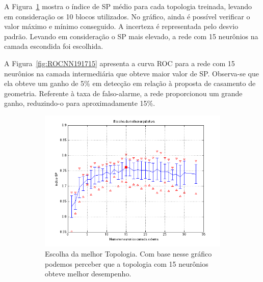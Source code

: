 A Figura~\ref{fig:Topology191715} mostra o índice de SP médio para cada
topologia treinada, levando em consideração os 10 blocos utilizados. No gráfico,
ainda é possível verificar o valor máximo e mínimo conseguido. A incerteza é
representada pelo desvio padrão. Levando em consideração o SP mais elevado, a
rede com 15 neurônios na camada escondida foi escolhida.

A Figura~\ref{fig:ROCNN191715} apresenta a  curva ROC para a rede com 15
neurônios na camada intermediária que obteve maior valor de SP. Observa-se que
ela obteve um ganho de 5\% em detecção em relação à proposta de casamento de
geometria.  Referente à taxa de falso-alarme, a rede proporcionou um grande
ganho, reduzindo-o para aproximadamente 15\%.


\begin{figure}[htpb!]
    \centering
        \begin{subfigure}[b]{0.45\textwidth}
                \centering
            \includegraphics[width=\textwidth]{images/sglmuon/plotSP.png}
            \caption{Escolha da melhor Topologia. Com base nesse gráfico podemos
            perceber que a topologia com 15 neurônios obteve melhor desempenho.}
            \label{fig:Topology191715}
        \end{subfigure}%
        ~
        \begin{subfigure}[b]{0.45\textwidth}
                \centering

\end{subfigure}
\end{figure}
